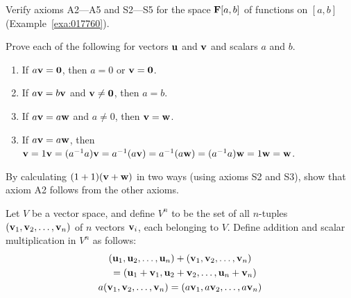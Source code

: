 \begin{multicols}{2}
\begin{ex}
\begin{sol}
\begin{enumerate}[label={\alph*.}]
\end{enumerate}
\end{sol}
\end{ex}

\begin{ex}
\label{ex:6_1_14}
Verify axioms A2---A5 and S2---S5 for the space $\textbf{F}[a, b]$ of functions on $[a, b]$ (Example~\ref{exa:017760}).
\end{ex}

\begin{ex}
Prove each of the following for vectors $\textbf{u}$ and $\textbf{v}$ and scalars $a$ and $b$.

\begin{enumerate}[label={\alph*.}]
\item If $a\textbf{v} = \textbf{0}$, then $a = 0$ or $\textbf{v} = \textbf{0}$.

\item If $a\textbf{v} = b\textbf{v}$ and $\textbf{v} \neq \textbf{0}$, then $a = b$.

\item If $a\textbf{v} = a\textbf{w}$ and $a \neq 0$, then $\textbf{v} = \textbf{w}$.

\end{enumerate}
\begin{sol}
\begin{enumerate}[label={\alph*.}]
\setcounter{enumi}{2}
\item  If $a\textbf{v} = a\textbf{w}$, then $\textbf{v} = 1\textbf{v} = (a^{-1}a)\textbf{v} = a^{-1}(a\textbf{v}) = a^{-1}(a\textbf{w}) = (a^{-1}a)\textbf{w} = 1\textbf{w} = \textbf{w}$.

\end{enumerate}
\end{sol}
\end{ex}

\begin{ex}
By calculating $(1 + 1)(\textbf{v} + \textbf{w})$ in two ways (using axioms S2 and S3), show that axiom A2 follows from the other axioms.
\end{ex}

\begin{ex}\label{ex:ex6_1_17}
Let $V$ be a vector space, and define $V^{n}$ to be the set of all $n$-tuples $(\textbf{v}_{1}, \textbf{v}_{2}, \dots, \textbf{v}_{n})$ of $n$ vectors $\textbf{v}_{i}$, each belonging to $V$. Define addition and scalar multiplication in $V^{n}$ as follows:
\begin{gather*}
(\textbf{u}_1, \textbf{u}_2, \dots, \textbf{u}_n) + (\textbf{v}_1, \textbf{v}_2, \dots, \textbf{v}_n) \\
\quad = (\textbf{u}_1 + \textbf{v}_1, \textbf{u}_2 + \textbf{v}_2, \dots, \textbf{u}_n + \textbf{v}_n) \\
a(\textbf{v}_1, \textbf{v}_2, \dots, \textbf{v}_n) = (a\textbf{v}_1, a\textbf{v}_2, \dots, a\textbf{v}_n)
\end{gather*}


\end{ex}
\end{multicols}
